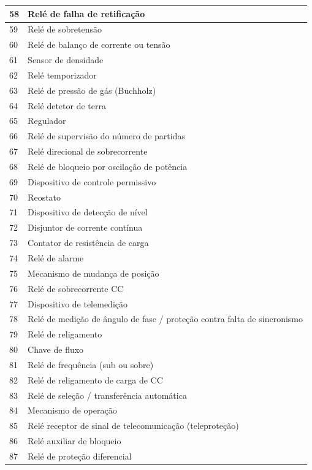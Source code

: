 \documentclass[a5paper]{ufsc-thesis}
\begin{document}
\begin{longtable}{|l|l|}
  58 & Relé de falha de retificação \\ \hline
  59 & Relé de sobretensão \\ \hline
  60 & Relé de balanço de corrente ou tensão \\ \hline
  61 & Sensor de densidade \\ \hline
  62 & Relé temporizador \\ \hline
  63 & Relé de pressão de gás (Buchholz) \\ \hline
  64 & Relé detetor de terra \\ \hline
  65 & Regulador \\ \hline
  66 & Relé de supervisão do número de partidas  \\ \hline
  67 & Relé direcional de sobrecorrente  \\ \hline
  68 & Relé de bloqueio por oscilação de potência \\ \hline
  69 & Dispositivo de controle permissivo \\ \hline
  70 & Reostato  \\ \hline
  71 & Dispositivo de detecção de nível \\ \hline
  72 & Disjuntor de corrente contínua \\ \hline
  73 & Contator de resistência de carga \\ \hline
  74 & Relé de alarme \\ \hline
  75 & Mecanismo de mudança de posição \\ \hline
  76 & Relé de sobrecorrente CC \\ \hline
  77 & Dispositivo de telemedição \\ \hline
  78 & Relé de medição de ângulo de fase / proteção contra falta de sincronismo \\ \hline
  79 & Relé de religamento \\ \hline
  80 & Chave de fluxo \\ \hline
  81 & Relé de frequência (sub ou sobre) \\ \hline
  82 & Relé de religamento de carga de CC \\ \hline
  83 & Relé de seleção / transferência automática \\ \hline
  84 & Mecanismo de operação \\ \hline
  85 & Relé receptor de sinal de telecomunicação (teleproteção) \\ \hline
  86 & Relé auxiliar de bloqueio \\ \hline
  87 & Relé de proteção diferencial \\ \hline

\end{longtable}
\end{document}
